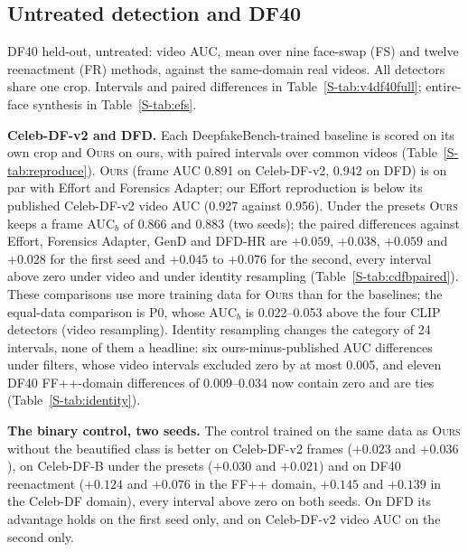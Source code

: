 \documentclass[conference]{IEEEtran}
\newcommand{\ours}{\textsc{Ours}}
\begin{document}
\subsection{Untreated detection and DF40}
\label{sec:detect}
\begin{table}[t]
\centering
\caption{DF40 held-out, untreated: video AUC, mean over nine face-swap (FS) and twelve reenactment (FR) methods, against the
same-domain real videos. All detectors share one crop. Intervals and paired differences in Table~\ref{S-tab:v4df40full};
entire-face synthesis in Table~\ref{S-tab:efs}.}
\label{tab:df40}
\footnotesize
\setlength{\tabcolsep}{3pt}
\begin{adjustbox}{max width=\columnwidth}\end{adjustbox}
\end{table}
\textbf{Celeb-DF-v2 and DFD.} Each DeepfakeBench-trained baseline is scored on its own crop and \ours{} on ours, with paired
intervals over common videos (Table~\ref{S-tab:reproduce}). \ours{} (frame AUC 0.891 on Celeb-DF-v2, 0.942 on DFD) is on par
with Effort and Forensics Adapter; our Effort reproduction is below its published Celeb-DF-v2 video AUC (0.927 against 0.956).
Under the presets \ours{} keeps a frame AUC$_b$ of 0.866 and 0.883 (two seeds); the paired differences against Effort, Forensics
Adapter, GenD and DFD-HR are $+0.059$, $+0.038$, $+0.059$ and $+0.028$ for the first seed and $+0.045$ to $+0.076$ for the second,
every interval above zero under video and under identity resampling (Table~\ref{S-tab:cdfbpaired}). These comparisons use more
training data for \ours{} than for the baselines; the equal-data comparison is P0, whose AUC$_b$ is 0.022--0.053 above the four
CLIP detectors (video resampling). Identity resampling changes the category of 24 intervals, none of them a headline: six
ours-minus-published AUC differences under filters, whose video intervals excluded zero by at most 0.005, and eleven DF40
FF++-domain differences of 0.009--0.034 now contain zero and are ties (Table~\ref{S-tab:identity}).

\textbf{The binary control, two seeds.} The control trained on the same data as \ours{} without the beautified class is better on
Celeb-DF-v2 frames ($+0.023$ and $+0.036$), on Celeb-DF-B under the presets ($+0.030$ and $+0.021$) and on DF40 reenactment ($+0.124$
and $+0.076$ in the FF++ domain, $+0.145$ and $+0.139$ in the Celeb-DF domain), every interval above zero on both seeds. On DFD its
advantage holds on the first seed only, and on Celeb-DF-v2 video AUC on the second only.
\end{document}

